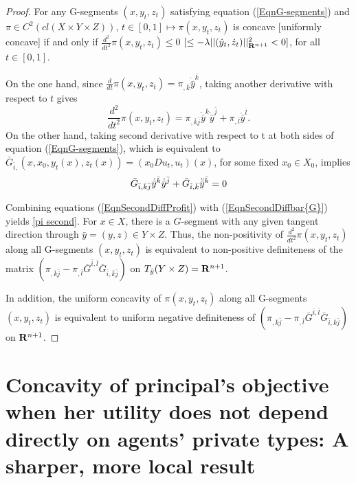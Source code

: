 \begin{proof}%
	For any G-segments $(x, y_t, z_t)$ satisfying equation (\ref{EqnG-segments}) and $\pi \in C^2(cl(X\times Y \times Z)
	)$,
	$t\in[0,1] \longmapsto \pi(x, y_t ,z_t)$ is concave [uniformly concave] if and only if $\frac{d^2}{dt^2} \pi(x, y_t, z_t)\le  0$ $[\le -\lambda ||(\dot{y}_t,\dot{z}_t)||^2_{{\mathbf R}^{n+1}}<0]$, for all $t \in [0,1]$.
	
	On the one hand, since $\frac{d}{dt}\pi(x, y_t, z_t) = \pi_{,\bar{k}} \dot{\bar y}^{\bar{k}}$, taking another derivative with respect to $t$ gives 
	\begin{equation}\label{EqnSecondDiffProfit}
	\frac{d^2}{dt^2} \pi(x, y_t, z_t) = 
	\pi_{,\bar{k}\bar{j}}\dot{\bar y}^{\bar{k}} \dot{\bar y}^{\bar{j}}+ \pi_{,\bar{l}}\ddot {\bar y}^{\bar{l}}.
	\end{equation}
	On the other hand, taking second derivative with respect to t at both sides of equation (\ref{EqnG-segments}), which is equivalent to $\bar{G}_{\bar{i},}(x, x_0, y_t(x), z_t(x)) = (x_0Du_t, u_t)(x)$, for some fixed $x_0\in X_0$, implies
	\begin{equation}\label{EqnSecondDiffbar{G}}
	\bar{G}_{\bar{i},\bar{k}\bar{j}}\dot{\bar y}^{\bar{k}} \dot {\bar y}^{\bar{j}}+\bar{G}_{\bar{i},\bar{k}} \ddot{\bar y}^{\bar{k}} =0 
	\end{equation}
	
	Combining equations (\ref{EqnSecondDiffProfit}) with (\ref{EqnSecondDiffbar{G}}) yields
	\eqref{pi second}.
	For $x \in X$, there is a $G$-segment with any given tangent direction through $\bar y = (y,z) \in Y \times Z$.
	Thus, the non-positivity  of $\frac{d^2}{dt^2} \pi(x, y_t, z_t)$ along all G-segments $(x, y_t, z_t)$ is equivalent to non-positive  definiteness of the matrix $(\pi_{,\bar{k}\bar{j}}- \pi_{,\bar{l}} \bar{G}^{\bar i,\bar l}\bar{G}_{\bar{i},\bar{k}\bar{j}})$ on $T_{\bar y} (Y\times Z)={\mathbf R}^{n+1}$.
	
	In addition, the uniform concavity of $\pi(x, y_t, z_t)$ along all G-segments $(x, y_t, z_t)$ is equivalent to uniform negative definiteness of $(\pi_{,\bar{k}\bar{j}}- \pi_{,\bar{l}} \bar{G}^{\bar i,\bar l}\bar{G}_{\bar{i},\bar{k}\bar{j}})$ on ${\mathbf R}^{n+1}$.
\end{proof}\medskip









\section{Concavity of principal's objective when her utility does not depend directly on agents' private types:  
	A sharper, more local result} 
\label{section:privateInformation}



